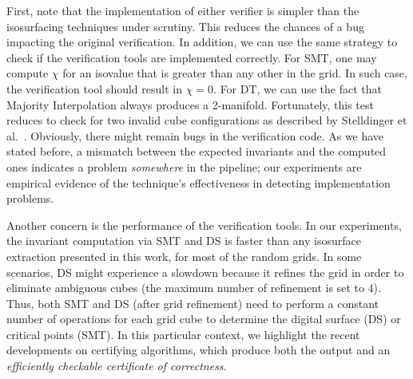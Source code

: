 First, note that the implementation of either verifier is simpler than
the isosurfacing techniques under scrutiny. This reduces the chances
of a bug impacting the original verification.  In addition, we can use
the same strategy to check if the verification tools are implemented
correctly. For SMT, one may compute $\chi$ for an isovalue that is
greater than any other in the grid. In such case, the verification
tool should result in $\chi = 0$. For DT, we can use the fact that
Majority Interpolation always produces a 2-manifold. Fortunately, this
test reduces to check for two invalid cube configurations as described
by Stelldinger et al.~\cite{siqueira:2007}. Obviously, there might
remain bugs in the verification code. As we have stated before, a
mismatch between the expected invariants and the computed ones
indicates a problem \emph{somewhere} in the pipeline; our experiments
are empirical evidence of the technique's effectiveness in detecting
implementation problems.

Another concern is the performance of the verification tools. In our
experiments, the invariant computation via SMT and DS is faster than
any isosurface extraction presented in this work, for most of the
random grids. In some scenarios, DS might experience a slowdown
because it refines the grid in order to eliminate ambiguous cubes (the
maximum number of refinement is set to 4). Thus, both SMT and DS (after
grid refinement) need to perform a constant number of operations
for each grid cube to determine the digital surface (DS) or critical
points (SMT).  In this particular context, we highlight the recent
developments on certifying algorithms, which produce both the
output and an \emph{efficiently checkable certificate of
  correctness}\cite{McConnell:2010:CA}.


